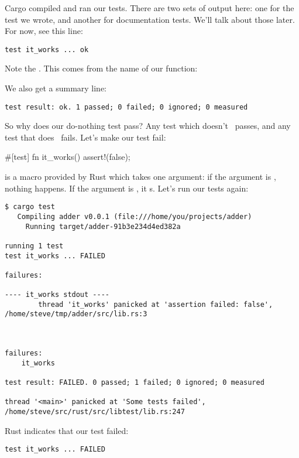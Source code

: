 Cargo compiled and ran our tests. There are two sets of output here: one for the test we wrote, and another for documentation tests. 
We'll talk about those later. For now, see this line:

\begin{verbatim}
test it_works ... ok
\end{verbatim}

Note the . This comes from the name of our function:

\begin{rustc}
fn it_works() {
\end{rustc}

We also get a summary line:

\begin{verbatim}
test result: ok. 1 passed; 0 failed; 0 ignored; 0 measured
\end{verbatim}

So why does our do-nothing test pass? Any test which doesn't \panic\ passes, and any test that does \panic\ fails. Let's make our test fail:

\begin{rustc}
#[test]
fn it_works() {
    assert!(false);
}
\end{rustc}

 is a macro provided by Rust which takes one argument: if the argument is , nothing happens. If the argument 
is , it \panic s. Let's run our tests again:

\begin{verbatim}
$ cargo test
   Compiling adder v0.0.1 (file:///home/you/projects/adder)
     Running target/adder-91b3e234d4ed382a

running 1 test
test it_works ... FAILED

failures:

---- it_works stdout ----
        thread 'it_works' panicked at 'assertion failed: false', /home/steve/tmp/adder/src/lib.rs:3



failures:
    it_works

test result: FAILED. 0 passed; 1 failed; 0 ignored; 0 measured

thread '<main>' panicked at 'Some tests failed', /home/steve/src/rust/src/libtest/lib.rs:247
\end{verbatim}

Rust indicates that our test failed:

\begin{verbatim}
test it_works ... FAILED
\end{verbatim}

